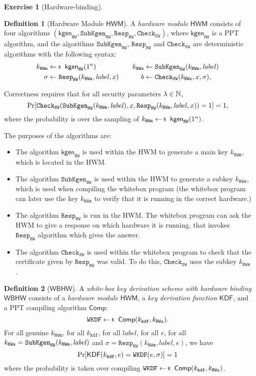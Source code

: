\documentclass[envcountsame,runningheads,notitlepage]{../llncs}
\theoremstyle{definition}
\newtheorem{graded}[crossed]{Exercise}
\renewcommand{\O}[1]{\ensuremath{\mathsf{#1}}}
\newtheorem*{definition*}{Definition}
\renewcommand{\O}[1]{\ensuremath{\mathsf{#1}}}
\newcommand{\StyleModel}[1]{\O{{#1}}}
\newcommand{\comp}{\textsf{Comp}}
\newcommand{\WBKDF}{\ensuremath{\mathtt{WKDF}}}
\newcommand{\context}{\ensuremath{e}}
\newcommand{\SCHWBKDF}{\ensuremath{\mathsf{WBHW}}}
\newcommand{\KDF}{\textsf{KDF}}
\newcommand{\SCHKDF}{\ensuremath{\mathsf{KDF}}}
\newcommand{\kkdf}{\ensuremath{k_{\mathtt{kdf}}}}
\renewcommand{\Check}{\ensuremath{\mathtt{Check}}}
\newcommand{\hw}{\ensuremath{\mathtt{HW}}}\newcommand{\SCHWM}{\ensuremath{\mathsf{HWM}}} 							%
\newcommand{\Resp}{\ensuremath{\mathtt{Resp}}}
\newcommand{\sw}{\ensuremath{\mathtt{SW}}}
\newcommand{\Subkgen}{\ensuremath{\mathtt{SubKgen}}} %
\newcommand{\kmaster}{\ensuremath{k_{\mathtt{HWm}}}}
\newcommand{\kslave}{\ensuremath{k_{\mathtt{HWs}}}}
\newcommand{\Label}{\ensuremath{\mathit{label}}}
\newcommand{\kgen}{\StyleModel{kgen}}
\begin{document}
\begin{graded}[Hardware-binding]
\begin{definition*}[Hardware Module $\SCHWM$]
	\label{def:hardware}
	A \emph{hardware module} $\SCHWM$ consists of four algorithms $(\kgen_\hw,\Subkgen_\hw,\Resp_\hw,\Check_\sw)$, where $\kgen_\hw$ is a PPT algorithm, and the algorithms $\Subkgen_\hw$, $\Resp_\hw$ and $\Check_\sw$ are deterministic algorithms with the following syntax:
	\begin{align*}
	\kmaster & \sample  \kgen_\hw(1^n)&&& \kslave & \gets \Subkgen_\hw(\kmaster, \Label)  \\
	\sigma &\gets  \Resp_\hw(\kmaster, \Label, x) &&& b	&\gets  \Check_\sw(\kslave, x, \sigma),
	\end{align*}
	
	
	Correctness requires that for all security parameters $\lambda\in\mathbb{N}$,
	\[\prob{\Check_\sw(\Subkgen_\hw(\kmaster,\Label),
		x,\Resp_\hw(\kmaster,\Label,x))=1}=1,\]
	where the probability is over the sampling of
	$\kmaster \sample \kgen_\hw(1^n)$.
\end{definition*}

The purposes of the algorithms are:
\begin{itemize}
	\item The algorithm $\kgen_\hw$ is used within the HWM to generate a main key $\kmaster$, which is located in the HWM.
	\item The algorithm $\Subkgen_\hw$ is used within the HWM to generate a subkey $\kslave$, which is used when compiling the whitebox program (the whitebox program can later use the key $\kslave$ to verify that it is running in the correct hardware.)
	\item The algorithm $\Resp_\hw$ is run in the HWM. The whitebox program can ask the HWM to give a response on which hardware it is running, that invokes $\Resp_\hw$ algorithm which gives the answer.
	\item The algorithm $\Check_\sw$ is used within the whitebox program to check that the certificate given by $\Resp_\hw$ was valid. To do this, $\Check_\sw$ uses the subkey $\kslave$.
\end{itemize}

\begin{definition*}[$\SCHWBKDF$]
A \emph{white-box key derivation scheme with hardware binding $\SCHWBKDF$} consists of a \emph{hardware module $\SCHWM$},
a \emph{key derivation function} $\SCHKDF$, and a PPT compiling algorithm $\comp$:
\[\WBKDF\sample \comp(\kkdf, \kslave).\]
For all genuine $\kmaster$, for all $\kkdf$, for all $\Label$, for all $\context$, for all $\kslave=\linebreak \Subkgen_\hw(\kmaster,\Label)$ and $\sigma=\Resp_\hw(\kmaster,\Label,\context)$, we have
$$\prob{\KDF(\kkdf, \context) =\WBKDF(\context,\sigma)}=1$$
where the probability is taken over compiling $\WBKDF\sample \comp(\kkdf, \kslave)$.
\end{definition*}


\end{graded}
\end{document}
